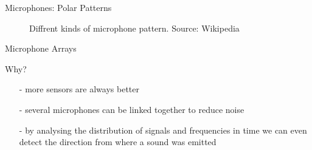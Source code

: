 \documentclass{beamer}
\begin{document}
	\begin{frame}{Microphones: Polar Patterns}
		\begin{figure}[ht]
			\centering
			\caption{Diffrent kinds of microphone pattern. Source: Wikipedia}
		\end{figure}
	\end{frame}
	
	\begin{frame}{Microphone Arrays}
		\begin{alertblock}{Why?}
			\begin{itemize}
				\item[-] more sensors are always better
				\item[-] several microphones can be linked together to reduce noise
				\item[-] by analysing the distribution of signals and frequencies in time we can even detect the direction from where a sound was emitted
			\end{itemize}
		\end{alertblock}
	\end{frame}
	
\end{document}
